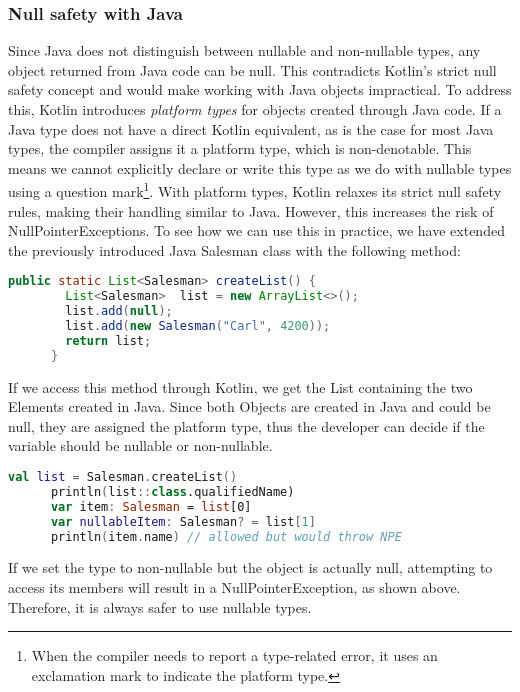 \documentclass[a4paper, 11pt]{article}
\begin{document}
  \subsubsection{Null safety with Java}
    Since Java does not distinguish between nullable and non-nullable types, any object returned from Java code can be null. This contradicts Kotlin's strict null safety concept and would make working with Java objects impractical.
    To address this, Kotlin introduces \textit{platform types} for objects created through Java code. If a Java type does not have a direct Kotlin equivalent, as is the case for most Java types, the compiler assigns it a platform type, which is non-denotable. This means we cannot explicitly declare or write this type as we do with nullable types using a question mark\footnote{When the compiler needs to report a type-related error, it uses an exclamation mark to indicate the platform type.}. With platform types, Kotlin relaxes its strict null safety rules, making their handling similar to Java. However, this increases the risk of NullPointerExceptions.
    To see how we can use this in practice, we have extended the previously introduced Java Salesman class with the following method:
    \begin{lstlisting}[language=Java]
      public static List<Salesman> createList() {
        List<Salesman>  list = new ArrayList<>();
        list.add(null);
        list.add(new Salesman("Carl", 4200));
        return list;
      }
    \end{lstlisting}
    If we access this method through Kotlin, we get the List containing the two Elements created in Java. Since both Objects are created in Java and could be null, they are assigned the platform type, thus the developer can decide if the variable should be nullable or non-nullable. 
    \begin{lstlisting}[language=Kotlin]  
      val list = Salesman.createList()
      println(list::class.qualifiedName)
      var item: Salesman = list[0]
      var nullableItem: Salesman? = list[1]
      println(item.name) // allowed but would throw NPE
    \end{lstlisting}
    If we set the type to non-nullable but the object is actually null, attempting to access its members will result in a NullPointerException, as shown above. Therefore, it is always safer to use nullable types.
\end{document}
